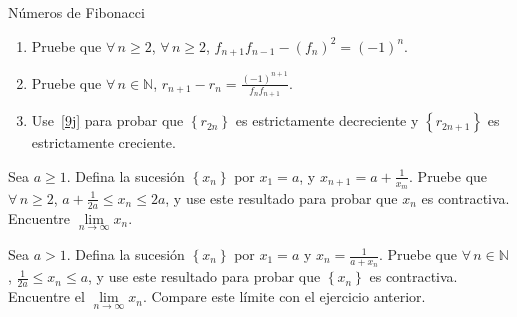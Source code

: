 \begin{prob}{Números de Fibonacci}
\begin{enumerate}
			Los matemáticos de la Grecia clásica llamaron esta proporción $R=\frac{a}{b}$ la ``\textbf{Proporción áurea}'' y cualquier rectángulo con lados en la proporción un ``\textbf{rectángulo áureo}''. Ellos consideraron esto como la más estéticamente agradable de todos los rectángulos, y se usó esto frecuentemente en su arte y arquitectura. Pruebe algebraicamente que $R=\alpha$, definida en~\ref{9f} arriba.
			\item Pruebe que $\forall\,n\geq2$, $\forall\,n\geq2$, $f_{n+1}f_{n-1}-{\left(f_{n}\right)}^{2}={\left(-1\right)}^{n}$.
			\item Pruebe que $\forall\,n\in\mathds{N}$, $r_{n+1}-r_{n}=\frac{{\left(-1\right)}^{n+1}}{f_{n}f_{n+1}}$.\label{9j}
			\item Use~\ref{9j} para probar que $\left\{r_{2n}\right\}$ es estrictamente decreciente y $\left\{r_{2n+1}\right\}$ es estrictamente creciente.
	\end{enumerate}
\end{prob}

\begin{prob}{}
	Sea $a\geq1$. Defina la sucesión $\left\{x_{n}\right\}$ por $x_{1}=a$, y $x_{n+1}=a+\frac{1}{x_{m}}$. Pruebe que $\forall\,n\geq2$, $a+\frac{1}{2a}\leq x_{n}\leq 2a$, y use este resultado para probar que $x_{n}$ es contractiva. Encuentre $\lim\limits_{n\to\infty}x_{n}$.
\end{prob}

\begin{prob}{}
	Sea $a>1$. Defina la sucesión $\left\{x_{n}\right\}$ por $x_{1}=a$ y $x_{n}=\frac{1}{a+x_{n}}$. Pruebe que $\forall\,n\in\mathds{N}$, $\frac{1}{2a}\leq x_{n}\leq a$, y use este resultado para probar que $\left\{x_{n}\right\}$ es contractiva. Encuentre el $\lim\limits_{n\to\infty}x_{n}$. Compare este límite con el ejercicio anterior.
\end{prob}